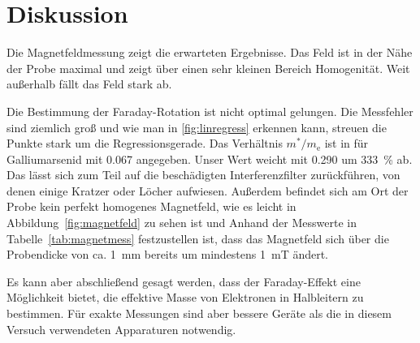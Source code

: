 
\section{Diskussion}
Die Magnetfeldmessung zeigt die erwarteten Ergebnisse. Das Feld ist in
der Nähe der Probe maximal und zeigt über einen sehr kleinen Bereich
Homogenität.  Weit außerhalb fällt das Feld stark ab.

Die Bestimmung der Faraday-Rotation ist nicht optimal gelungen.  Die 
Messfehler sind ziemlich groß und wie man in \cref{fig:linregress}
erkennen kann, streuen die Punkte stark um die Regressionsgerade. Das
Verhältnis $m^*/m_\text{e}$ ist in \cite{ecee-colorado} für
Galliumarsenid mit \num{0.067} angegeben.  Unser Wert weicht mit
\num{0.290} um \SI{333}{\percent} ab.  Das lässt sich zum Teil auf
die beschädigten Interferenzfilter zurückführen, von denen einige Kratzer
oder Löcher aufwiesen. Außerdem befindet sich am Ort der Probe 
kein perfekt homogenes Magnetfeld, wie es leicht in 
Abbildung~\ref{fig:magnetfeld} zu sehen ist und Anhand der Messwerte 
in Tabelle~\ref{tab:magnetmess} festzustellen ist, dass das Magnetfeld 
sich über die Probendicke von ca. \SI{1}{\milli\metre} bereits um 
mindestens \SI{1}{\milli\tesla} ändert.

Es kann aber abschließend gesagt werden, dass der Faraday-Effekt 
eine Möglichkeit bietet, die effektive Masse von Elektronen in 
Halbleitern zu bestimmen. Für exakte Messungen sind aber 
bessere Geräte als die in diesem Versuch verwendeten Apparaturen 
notwendig. 
